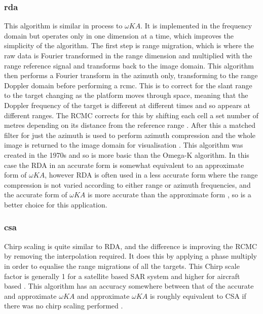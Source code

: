 \subsubsection{\gls{rda}}
This algorithm is similar in process to $\omega KA$. It is implemented in the frequency domain but operates only in one dimension at a time, which improves the simplicity of the algorithm. The first step is range migration, which is where the raw data is Fourier transformed in the range dimension and multiplied with the range reference signal and transforms back to the image domain. This algorithm then performs a Fourier transform in the azimuth only, transforming to the range Doppler domain before performing a \gls{rcmc}. This is to correct for the slant range to the target changing as the platform moves through space, meaning that the Doppler frequency of the target is different at different times and so appears at different ranges. The RCMC corrects for this by shifting each cell a set number of metres depending on its distance from the reference range \cite{parasharStudyRangeCell2015}. After this a matched filter for just the azimuth is used to perform azimuth compression and the whole image is returned to the image domain for visualisation \cite{dastgirProcessingSARData2007}. This algorithm was created in the 1970s and so is more basic than the Omega-K algorithm. In this case the RDA in an accurate form is somewhat equivalent to an approximate form of $\omega KA$, however RDA is often used in a less accurate form where the range compression is not varied according to either range or azimuth frequencies, and the accurate form of $\omega KA$ is more accurate than the approximate form \cite{cummingInterpretationsOmegaKAlgorithm2003}, so is a better choice for this application.
\subsubsection{\gls{csa}}
Chirp scaling is quite similar to RDA, and the difference is improving the RCMC by removing the interpolation required. It does this by applying a phase multiply in order to equalise the range migrations of all the targets. This Chirp scale factor is generally 1 for a satellite based SAR system and higher for aircraft based \cite{dastgirProcessingSARData2007}. This algorithm has an accuracy somewhere between that of the accurate and approximate $\omega KA$ and approximate $\omega KA$ is  roughly equivalent to CSA if there was no chirp scaling performed \cite{cummingInterpretationsOmegaKAlgorithm2003}.
